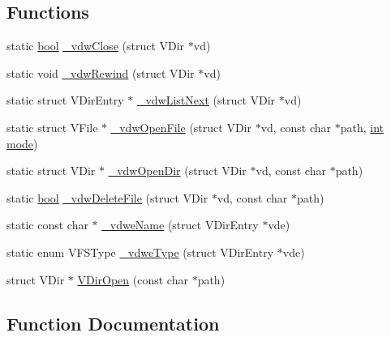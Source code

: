 \subsection*{Functions}
\begin{DoxyCompactItemize}
\item 
static \mbox{\hyperlink{libretro_8h_a4a26dcae73fb7e1528214a068aca317e}{bool}} \mbox{\hyperlink{vfs-w32_8c_a6296f276728439eb045fc677652fc5f9}{\+\_\+vdw\+Close}} (struct V\+Dir $\ast$vd)
\item 
static void \mbox{\hyperlink{vfs-w32_8c_aa13a5e3490d91a1207db9f34666b12a1}{\+\_\+vdw\+Rewind}} (struct V\+Dir $\ast$vd)
\item 
static struct V\+Dir\+Entry $\ast$ \mbox{\hyperlink{vfs-w32_8c_a65c8ce6577ea3b8a6300f2c95ad372ad}{\+\_\+vdw\+List\+Next}} (struct V\+Dir $\ast$vd)
\item 
static struct V\+File $\ast$ \mbox{\hyperlink{vfs-w32_8c_a748986f90f041704959b73a453216e4f}{\+\_\+vdw\+Open\+File}} (struct V\+Dir $\ast$vd, const char $\ast$path, \mbox{\hyperlink{ioapi_8h_a787fa3cf048117ba7123753c1e74fcd6}{int}} \mbox{\hyperlink{ioapi_8h_a7e43d41c2fe013a373b540cba02505cf}{mode}})
\item 
static struct V\+Dir $\ast$ \mbox{\hyperlink{vfs-w32_8c_a602c5a9cb86c217774922a5e150e640c}{\+\_\+vdw\+Open\+Dir}} (struct V\+Dir $\ast$vd, const char $\ast$path)
\item 
static \mbox{\hyperlink{libretro_8h_a4a26dcae73fb7e1528214a068aca317e}{bool}} \mbox{\hyperlink{vfs-w32_8c_a2d2d07ef2c4dd06024930003a76dbf33}{\+\_\+vdw\+Delete\+File}} (struct V\+Dir $\ast$vd, const char $\ast$path)
\item 
static const char $\ast$ \mbox{\hyperlink{vfs-w32_8c_a1934e51aba094c34fa52f1fc7ed8505b}{\+\_\+vdwe\+Name}} (struct V\+Dir\+Entry $\ast$vde)
\item 
static enum V\+F\+S\+Type \mbox{\hyperlink{vfs-w32_8c_a70662c6113d4ab96de82bb863ef01d87}{\+\_\+vdwe\+Type}} (struct V\+Dir\+Entry $\ast$vde)
\item 
struct V\+Dir $\ast$ \mbox{\hyperlink{vfs-w32_8c_a2966065604f0fcfa278b5246d4d653b9}{V\+Dir\+Open}} (const char $\ast$path)
\end{DoxyCompactItemize}


\subsection{Function Documentation}
\mbox{\label{vfs-w32_8c_a6296f276728439eb045fc677652fc5f9}} 
